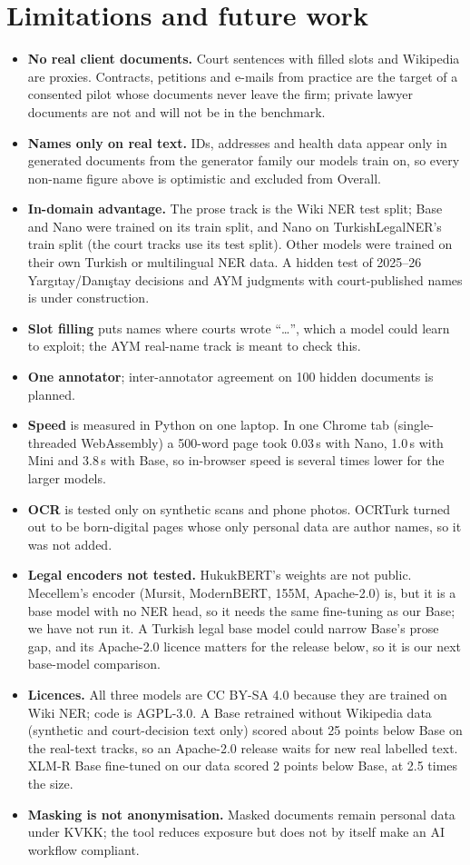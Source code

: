 \documentclass[10pt,twocolumn]{article}
\begin{document}
\section{Limitations and future work}
\label{sec:limits}
\begin{itemize}
\item \textbf{No real client documents.} Court sentences with filled slots and Wikipedia are proxies. Contracts,
petitions and e-mails from practice are the target of a consented pilot whose documents never leave the firm;
private lawyer documents are not and will not be in the benchmark.
\item \textbf{Names only on real text.} IDs, addresses and health data appear only in generated documents from
the generator family our models train on, so every non-name figure above is optimistic and excluded from Overall.
\item \textbf{In-domain advantage.} The prose track is the Wiki NER test split; Base and Nano were trained on its
train split, and Nano on TurkishLegalNER's train split (the court tracks use its test split). Other models were
trained on their own Turkish or multilingual NER data. A hidden test of 2025--26 Yarg{\i}tay/Dan{\i}{\c{s}}tay decisions
and AYM judgments with court-published names is under construction.
\item \textbf{Slot filling} puts names where courts wrote ``\ldots'', which a model could learn to exploit; the AYM
real-name track is meant to check this.
\item \textbf{One annotator}; inter-annotator agreement on 100 hidden documents is planned.
\item \textbf{Speed} is measured in Python on one laptop. In one Chrome tab (single-threaded WebAssembly) a
500-word page took 0.03\,s with Nano, 1.0\,s with Mini and 3.8\,s with Base, so in-browser speed is several times
lower for the larger models.
\item \textbf{OCR} is tested only on synthetic scans and phone photos. OCRTurk \citep{ocrturk2026} turned out to
be born-digital pages whose only personal data are author names, so it was not added.
\item \textbf{Legal encoders not tested.} HukukBERT's weights are not public. Mecellem's encoder
(Mursit, ModernBERT, 155M, Apache-2.0) is, but it is a base model with no NER head, so it needs the same
fine-tuning as our Base; we have not run it. A Turkish legal base model could narrow Base's prose gap, and its
Apache-2.0 licence matters for the release below, so it is our next base-model comparison.
\item \textbf{Licences.} All three models are CC BY-SA 4.0 because they are trained on Wiki NER; code is AGPL-3.0.
A Base retrained without Wikipedia data (synthetic and court-decision text only) scored about 25 points below Base on
the real-text tracks, so an Apache-2.0 release waits for new real labelled text. XLM-R Base fine-tuned on our data scored 2 points
below Base, at 2.5 times the size.
\item \textbf{Masking is not anonymisation.} Masked documents remain personal data under KVKK; the tool reduces
exposure but does not by itself make an AI workflow compliant.
\end{itemize}
\end{document}
